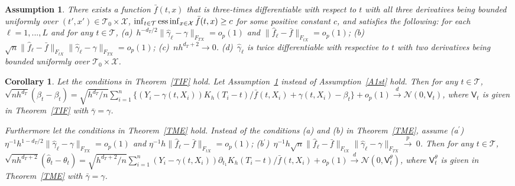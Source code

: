 \documentclass[lettersize, 12pt]{article}
\newtheorem{assumption}{Assumption}
\newtheorem{corollary}{Corollary}
\begin{document}
\begin{assumption}
There exists a function $\bar f(t,x)$ that 
is three-times differentiable with respect to $t$ with all
three derivatives being bounded uniformly over $(t',x') \in\mathcal{T}_0\times\mathcal{X}$,
$\inf_{t\in\mathcal{T}}{\rm ess}\inf_{x\in\mathcal{X}}
 \bar f(t,x) \geq c$ for some positive constant $c$, and satisfies the following: 
for each $\ell= 1,...,L$ and for any $t \in \mathcal{T}$,
(a)~$h^{-d_T/2} \|\hat \gamma_\ell - \gamma\|_{F_{TX}}= o_p(1)$ and $\| \hat f_\ell - \bar f \|_{F_{tX}} = o_p(1)$;
(b)~$\sqrt{n}\|\hat f_\ell - \bar f\|_{F_{tX}} \|\hat\gamma_\ell -  \gamma\|_{F_{TX}} = o_p(1)$; 
(c)~$nh^{d_T + 2} \rightarrow 0$.
(d)~$\hat\gamma_\ell$ is twice differentiable with respective to $t$ with two derivatives being bounded uniformly over $\mathcal{T}_0\times\mathcal{X}$.
\label{A1stL2}
\end{assumption}


\begin{corollary}
Let the conditions in Theorem~\ref{TIF} hold.
Let Assumption~\ref{A1stL2} instead of Assumption~\ref{A1st} hold.
Then for any $t\in\mathcal{T}$, 
$\sqrt{nh^{d_T}} \left(\hat \beta_t - \beta_t \right) 
= \sqrt{h^{d_T}/n} \sum_{i=1}^n\Big\{
(Y_i - \gamma(t, X_i)) K_h(T_i-t)/\bar f(t,X_i)
+  \gamma(t, X_i) - \beta_t  \Big\}
+ o_p(1)
\stackrel{d}{\longrightarrow} \mathcal{N}\left(0, \mathsf{V}_t\right)$,
where $\mathsf{V}_t$ is given in Theorem~\ref{TIF} with $\bar\gamma=\gamma$.


Furthermore let the conditions in Theorem~\ref{TME} hold.
Instead of the conditions (a) and (b) in Theorem~\ref{TME}, assume 
(a$^\prime$)~$\eta^{-1}h^{1-d_T/2}\big\|\hat \gamma_\ell -  \gamma \big\|_{F_{TX}} = o_p(1)$ and 
$\eta^{-1}h\big\|\hat f_\ell - \bar f \big\|_{F_{tX}} = o_p(1)$;
(b$^\prime$)~$\eta^{-1}h\sqrt{n} \big\| \hat f_\ell - \bar f \big\|_{F_{tX}}  \big\| \hat\gamma_\ell - \gamma\big\|_{F_{TX}}  \stackrel{p}{\rightarrow}~0$. 
Then for any $t \in \mathcal{T}$, 
$\sqrt{nh^{d_T + 2}}( \hat \theta_t - \theta_{t} ) = \sqrt{h^{d_T+2}/n}  \sum_{i=1}^n  (Y_i - \gamma(t, X_i))
\partial_{t_1} K_h(T_i - t)
/\bar f(t,X_i)
 + o_p(1)   \stackrel{d}{\longrightarrow}  \mathcal{N}(0, \mathsf{V}_t^\theta)$,
where 
$\mathsf{V}_t^\theta$ is given in Theorem~\ref{TME} with $\bar\gamma = \gamma$.
\label{CL2}
\end{corollary}
\end{document}
